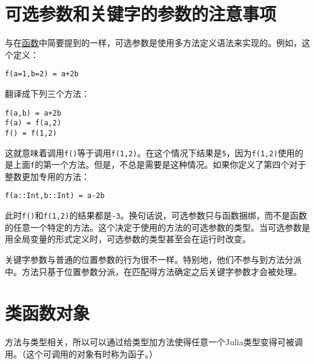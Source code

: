 \hypertarget{6114459498123607412}{}


\section{可选参数和关键字的参数的注意事项}



与在\hyperlink{645008301484218813}{函数}中简要提到的一样，可选参数是使用多方法定义语法来实现的。例如，这个定义：




\begin{verbatim}
f(a=1,b=2) = a+2b
\end{verbatim}



翻译成下列三个方法：




\begin{verbatim}
f(a,b) = a+2b
f(a) = f(a,2)
f() = f(1,2)
\end{verbatim}



这就意味着调用\texttt{f()}等于调用\texttt{f(1,2)}。在这个情况下结果是\texttt{5}，因为\texttt{f(1,2)}使用的是上面\texttt{f}的第一个方法。但是，不总是需要是这种情况。如果你定义了第四个对于整数更加专用的方法：




\begin{verbatim}
f(a::Int,b::Int) = a-2b
\end{verbatim}



此时\texttt{f()}和\texttt{f(1,2)}的结果都是\texttt{-3}。换句话说，可选参数只与函数捆绑，而不是函数的任意一个特定的方法。这个决定于使用的方法的可选参数的类型。当可选参数是用全局变量的形式定义时，可选参数的类型甚至会在运行时改变。



关键字参数与普通的位置参数的行为很不一样。特别地，他们不参与到方法分派中。方法只基于位置参数分派，在匹配得方法确定之后关键字参数才会被处理。



\hypertarget{12721694880938168924}{}


\section{类函数对象}



方法与类型相关，所以可以通过给类型加方法使得任意一个Julia类型变得{\textquotedbl}可被调用{\textquotedbl}。（这个{\textquotedbl}可调用{\textquotedbl}的对象有时称为{\textquotedbl}函子{\textquotedbl}。）



